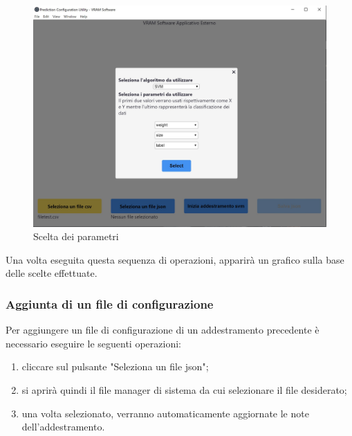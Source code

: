 		\mbox{}
		\mbox{}
		\begin{figure} [H]
			\begin{center}
				\includegraphics[width=120mm]{./img/2.jpg}
			\end{center}
			\caption{Scelta dei parametri}
		\end{figure}
		\mbox{}
		Una volta eseguita questa sequenza di operazioni, apparirà un grafico sulla base delle scelte effettuate.
		\subsubsection{Aggiunta di un file di configurazione}
		Per aggiungere un file di configurazione di un addestramento precedente è necessario eseguire le seguenti operazioni:
		\begin{enumerate}
			\item cliccare sul pulsante "Seleziona un file json";
			\item si aprirà quindi il file manager di sistema da cui selezionare il file desiderato;
			\item una volta selezionato, verranno automaticamente aggiornate le note dell'addestramento.
		\end{enumerate}
